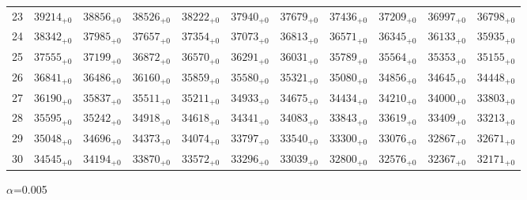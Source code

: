 \documentclass[10pt, a4paper]{article}
\begin{document}
\begin{center}
\begin{tabular}{c || c c c c c | c c c c c}
        23 & \({39214}_{+0}\) & \({38856}_{+0}\) & \({38526}_{+0}\) & \({38222}_{+0}\) & \({37940}_{+0}\) & \({37679}_{+0}\) & \({37436}_{+0}\) & \({37209}_{+0}\) & \({36997}_{+0}\) & \({36798}_{+0}\)\\
        24 & \({38342}_{+0}\) & \({37985}_{+0}\) & \({37657}_{+0}\) & \({37354}_{+0}\) & \({37073}_{+0}\) & \({36813}_{+0}\) & \({36571}_{+0}\) & \({36345}_{+0}\) & \({36133}_{+0}\) & \({35935}_{+0}\)\\
        25 & \({37555}_{+0}\) & \({37199}_{+0}\) & \({36872}_{+0}\) & \({36570}_{+0}\) & \({36291}_{+0}\) & \({36031}_{+0}\) & \({35789}_{+0}\) & \({35564}_{+0}\) & \({35353}_{+0}\) & \({35155}_{+0}\)\\
        \hline
        26 & \({36841}_{+0}\) & \({36486}_{+0}\) & \({36160}_{+0}\) & \({35859}_{+0}\) & \({35580}_{+0}\) & \({35321}_{+0}\) & \({35080}_{+0}\) & \({34856}_{+0}\) & \({34645}_{+0}\) & \({34448}_{+0}\)\\
        27 & \({36190}_{+0}\) & \({35837}_{+0}\) & \({35511}_{+0}\) & \({35211}_{+0}\) & \({34933}_{+0}\) & \({34675}_{+0}\) & \({34434}_{+0}\) & \({34210}_{+0}\) & \({34000}_{+0}\) & \({33803}_{+0}\)\\
        28 & \({35595}_{+0}\) & \({35242}_{+0}\) & \({34918}_{+0}\) & \({34618}_{+0}\) & \({34341}_{+0}\) & \({34083}_{+0}\) & \({33843}_{+0}\) & \({33619}_{+0}\) & \({33409}_{+0}\) & \({33213}_{+0}\)\\
        29 & \({35048}_{+0}\) & \({34696}_{+0}\) & \({34373}_{+0}\) & \({34074}_{+0}\) & \({33797}_{+0}\) & \({33540}_{+0}\) & \({33300}_{+0}\) & \({33076}_{+0}\) & \({32867}_{+0}\) & \({32671}_{+0}\)\\
        30 & \({34545}_{+0}\) & \({34194}_{+0}\) & \({33870}_{+0}\) & \({33572}_{+0}\) & \({33296}_{+0}\) & \({33039}_{+0}\) & \({32800}_{+0}\) & \({32576}_{+0}\) & \({32367}_{+0}\) & \({32171}_{+0}\)\\
        \hline
    \end{tabular}
    \pagebreak

    \(\alpha\)=0.005


\end{center}
\end{document}
